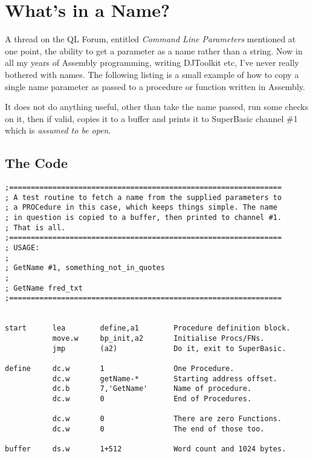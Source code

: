 \chapter{What's in a Name?}

A thread on the QL Forum, entitled \emph{Command Line Parameters} mentioned at one point, the ability to get a parameter as a name rather than a string. Now in all my years of Assembly programming, writing DJToolkit etc, I've never really bothered with names. The following listing is a small example of how to copy a single name parameter as passed to a procedure or function written in Assembly.

It does not do anything useful, other than take the name passed, run some checks on it, then if valid, copies it to a buffer and prints it to SuperBasic channel \#1 which is \emph{assumed to be open}.

\section{The Code}


\begin{lstlisting}[firstnumber=1,caption={GetName - Definition Block}]
;===============================================================
; A test routine to fetch a name from the supplied parameters to 
; a PROCedure in this case, which keeps things simple. The name
; in question is copied to a buffer, then printed to channel #1. 
; That is all.
;===============================================================
; USAGE:
;
; GetName #1, something_not_in_quotes
;
; GetName fred_txt
;===============================================================


start      lea        define,a1        Procedure definition block.
           move.w     bp_init,a2       Initialise Procs/FNs.
           jmp        (a2)             Do it, exit to SuperBasic.	 

define     dc.w       1                One Procedure.
           dc.w       getName-*        Starting address offset.
           dc.b       7,'GetName'      Name of procedure.
           dc.w       0                End of Procedures.

           dc.w       0                There are zero Functions.
           dc.w       0                The end of those too.

buffer     ds.w       1+512            Word count and 1024 bytes.
\end{lstlisting}

